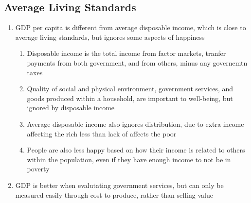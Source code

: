 \subsection{Average Living Standards}
\begin{enumerate}
\item GDP per capita is different from average disposable income, which is close to average living standards, but ignores some aspects of happiness
\begin{enumerate}
\item Disposable income is the total income from factor markets, tranfer payments from both government, and from others, minus any governemtn taxes
\item Quality of social and physical environment, government services, and goods produced within a household, are important to well-being, but ignored by disposable income
\item Average disposable income also ignores distribution, due to extra income affecting the rich less than lack of affects the poor
\item People are also less happy based on how their income is related to others within the population, even if they have enough income to not be in poverty
\end{enumerate}
\item GDP is better when evalutating government services, but can only be measured easily through cost to produce, rather than selling value
\end{enumerate}

